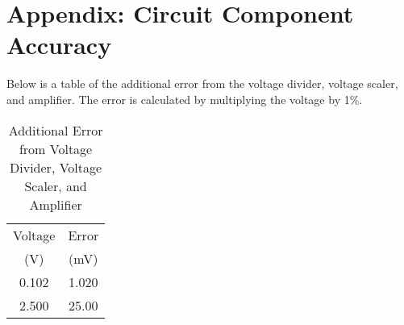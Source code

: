 \section{Appendix: Circuit Component Accuracy}
\label{sec:appendix-circuit-component-accuracy}
Below is a table of the additional error from the voltage divider, voltage scaler, and amplifier. The error is calculated by multiplying the voltage by 1\%.

\begin{table}[h]
    \centering
    \caption{Additional Error from Voltage Divider, Voltage Scaler, and Amplifier}
    \begin{tabular}{cc}
        \toprule 
        Voltage & Error \\
        (V) & (mV) \\
        \midrule
    0.102 & 1.020  \\
    2.500 & 25.00 \\
    \bottomrule
    \end{tabular}
\end{table}